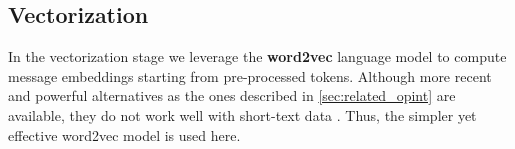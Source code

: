 \subsection{Vectorization} \label{sec:vectorization}

In the vectorization stage we leverage the \textbf{word2vec} language model \cite{mikolov2013word2vec} to compute message embeddings starting from pre-processed tokens.
Although more recent and powerful alternatives as the ones described in \cref{sec:related_opint} are available, they do not work well with short-text data \cite{albalawi2020short-text}. Thus, the simpler yet effective word2vec model is used here.

